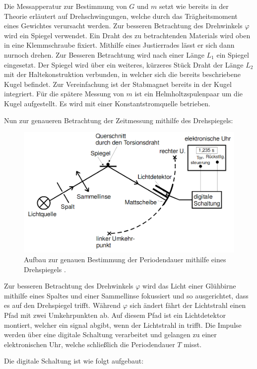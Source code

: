        Die Messapperatur zur Bestimmung von $G$ und $m$ setzt wie bereits in der
        Theorie erläutert auf Drehschwingungen, welche durch das Trägheitsmoment
        eines Gewichtes verursacht werden. Zur besseren Betrachtung des Drehwinkels
          $\varphi$ wird ein Spiegel verwendet. Ein Draht des zu betrachtenden
           Materials wird oben in eine Klemmschraube fixiert. Mithilfe eines
           Justierrades lässt er sich dann nurnoch drehen. Zur Besseren
            Betrachtung wird nach einer Länge $L_1$ ein Spiegel eingesetzt. Der
             Spiegel wird über ein weiteres, kürzeres Stück Draht der Länge $L_2$ mit
             der Haltekonstruktion verbunden, in welcher sich die bereits
              beschriebene Kugel befindet. Zur Vereinfachung ist der Stabmagnet
               bereits in der Kugel integriert. Für die spätere Messung von $m$
                ist ein Helmholtzspulenpaar um die Kugel aufgestellt. Es wird
                 mit einer Konstantstromquelle betrieben.

                 Nun zur genaueren Betrachtung der Zeitmessung mithilfe des Drehspiegels:

                 \begin{figure}[H]
                          \centering
                          \includegraphics[width=\linewidth-150pt,height=\textheight-150pt,keepaspectratio]{content/Bilder/Drehspiegel.png}
                          \caption{Aufbau zur genauen Bestimmung der Periodendauer mithilfe eines Drehspiegels \cite{V102}.}
                          \label{fig:Drehspiegel}
                        \end{figure}

Zur besseren Betrachtung des Drehwinkels $\varphi$ wird das Licht einer Glühbirne
 mithilfe eines Spaltes und einer Sammellinse fokussiert und so ausgerichtet,
  dass es auf den Drehspiegel trifft. Während $\varphi$ sich ändert fährt der
   Lichtstrahl einen Pfad mit zwei Umkehrpunkten ab. Auf diesem Pfad ist ein
    Lichtdetektor montiert, welcher ein signal abgibt, wenn der Lichtstrahl
     in trifft. Die Impulse werden über eine digitale Schaltung verarbeitet und
      gelangen zu einer elektronischen Uhr, welche schließlich die Periodendauer $T$ misst.

      Die digitale Schaltung ist wie folgt aufgebaut:
